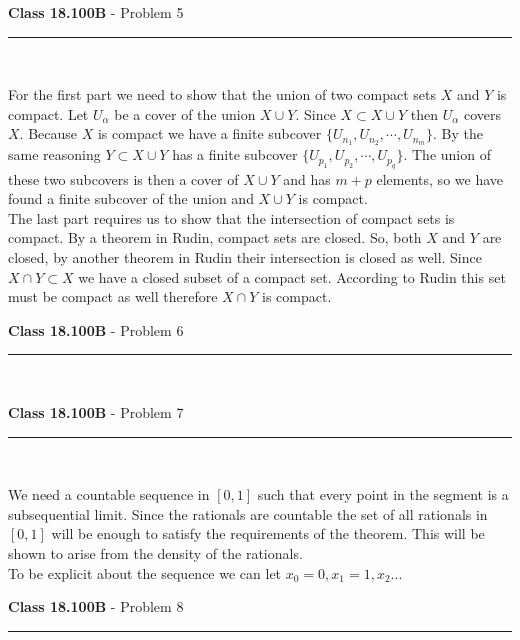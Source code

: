 \documentclass[11pt,reqno]{article}
\begin{document}
\vspace{15pt}
\begin{flushleft} 
\textbf{Class 18.100B} - Problem 5\\
\rule{500pt}{1pt}\\
\end{flushleft} 

For the first part we need to show that the union of two compact sets $X$ and $Y$ is compact. Let $U_{\alpha}$ be a cover of the union $X \cup Y$. Since $X \subset X \cup Y$ then $U_{\alpha}$ covers $X$. Because $X$ is compact we have a finite subcover $\{ U_{n_1}, U_{n_2}, \cdots, U_{n_m} \}$. By the same reasoning $Y \subset X \cup Y$ has a finite subcover $\{ U_{p_1}, U_{p_2}, \cdots, U_{p_q} \}$. The union of these two subcovers is then a cover of $X \cup Y$ and has $m + p$ elements, so we have found a finite subcover of the union and $X \cup Y$ is compact.\\
\indent The last part requires us to show that the intersection of compact sets is compact. By a theorem in Rudin, compact sets are closed. So, both $X$ and $Y$ are closed, by another theorem in Rudin their intersection is closed as well. Since $X \cap Y \subset X$ we have a closed subset of a compact set. According to Rudin this set must be compact as well therefore $X \cap Y$ is compact.

\vspace{15pt}
\begin{flushleft} 
\textbf{Class 18.100B} - Problem 6\\
\rule{500pt}{1pt}\\
\end{flushleft} 

\vspace{15pt}
\begin{flushleft} 
\textbf{Class 18.100B} - Problem 7\\
\rule{500pt}{1pt}\\
\end{flushleft} 

We need a countable sequence in $[0,1]$ such that every point in the segment is a subsequential limit. Since the rationals are countable the set of all rationals in $[0,1]$ will be enough to satisfy the requirements of the theorem. This will be shown to arise from the density of the rationals.\\
\indent To be explicit about the sequence we can let $x_0 = 0, x_1 = 1, x_2...$

\vspace{15pt}
\begin{flushleft} 
\textbf{Class 18.100B} - Problem 8\\
\rule{500pt}{1pt}\\
\end{flushleft} 
\end{document}
